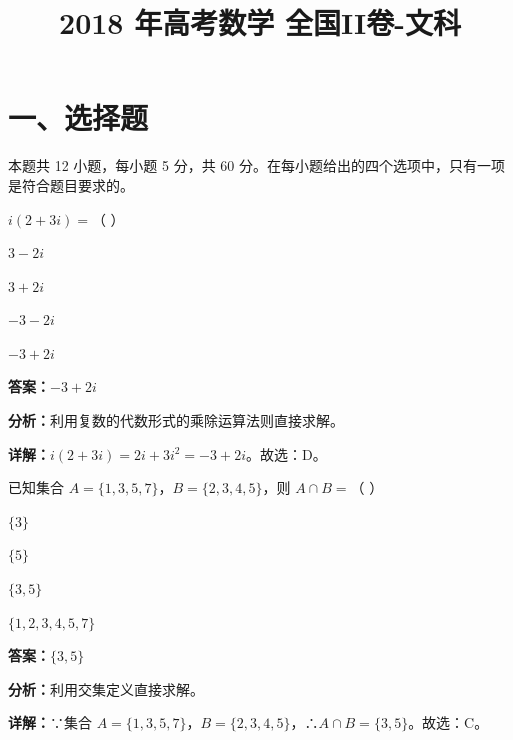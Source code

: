 ﻿\title{2018 年高考数学 全国II卷-文科}
\date{}
\maketitle

\section*{一、选择题}
本题共 12 小题，每小题 5 分，共 60 分。在每小题给出的四个选项中，只有一项是符合题目要求的。

\begin{question}[points=5]
$i(2+3i)=$（ ）
\begin{choices}
  \item $3-2i$
  \item $3+2i$
  \item $-3-2i$
  \item $-3+2i$
\end{choices}
\begin{solution}
\textbf{答案：}$-3+2i$

\textbf{分析：}利用复数的代数形式的乘除运算法则直接求解。

\textbf{详解：}$i(2+3i)=2i+3i^2=-3+2i$。故选：D。
\end{solution}
\end{question}

\begin{question}[points=5]
已知集合 $A=\{1,3,5,7\}$，$B=\{2,3,4,5\}$，则 $A\cap B=$（ ）
\begin{choices}
  \item $\{3\}$
  \item $\{5\}$
  \item $\{3,5\}$
  \item $\{1,2,3,4,5,7\}$
\end{choices}
\begin{solution}
\textbf{答案：}$\{3,5\}$

\textbf{分析：}利用交集定义直接求解。

\textbf{详解：}∵集合 $A=\{1,3,5,7\}$，$B=\{2,3,4,5\}$，∴$A\cap B=\{3,5\}$。故选：C。
\end{solution}
\end{question}


